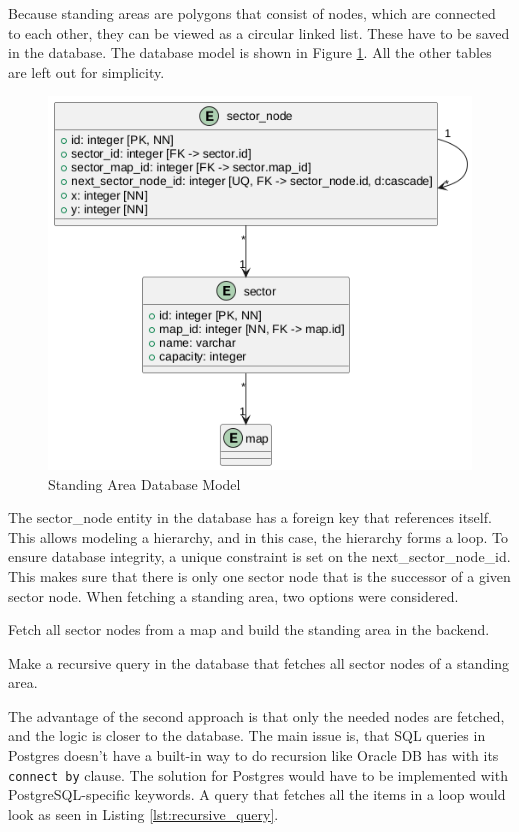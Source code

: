 Because standing areas are polygons that consist of nodes, which are connected to each other, they can be viewed as a circular linked list. These have to be saved in the database. The database model is shown in Figure \ref{fig:standing_area_db_model}. All the other tables are left out for simplicity.

\begin{figure}
    \centering
    \includegraphics[scale=0.5]{pics/standing-area-db.png}
    \caption{Standing Area Database Model}
    \label{fig:standing_area_db_model}
\end{figure}

The sector\_node entity in the database has a foreign key that references itself. This allows modeling a hierarchy, and in this case, the hierarchy forms a loop. To ensure database integrity, a unique constraint is set on the next\_sector\_node\_id. This makes sure that there is only one sector node that is the successor of a given sector node. When fetching a standing area, two options were considered.

\begin{compactenum}
\item Fetch all sector nodes from a map and build the standing area in the backend.
\item Make a recursive query in the database that fetches all sector nodes of a standing area.
\end{compactenum}

The advantage of the second approach is that only the needed nodes are fetched, and the logic is closer to the database. The main issue is, that SQL queries in Postgres doesn't have  a built-in way to do recursion like Oracle DB has with its \texttt{connect by} clause. The solution for Postgres would have to be implemented with PostgreSQL-specific keywords. A query that fetches all the items in a loop would look as seen in Listing \ref{lst:recursive_query}. 

